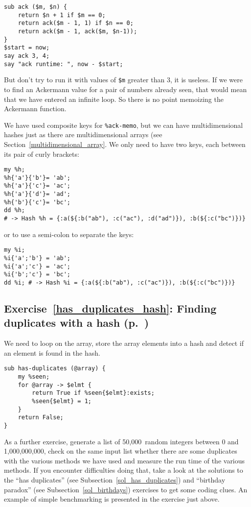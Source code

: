 {\begin{verbatim}
sub ack ($m, $n) {
    return $n + 1 if $m == 0;
    return ack($m - 1, 1) if $n == 0;
    return ack($m - 1, ack($m, $n-1));
}
$start = now;
say ack 3, 4;
say "ack runtime: ", now - $start;
\end{verbatim}

But don't try to run it with values of \verb'$m' greater 
than 3, it is useless. If we were to find an Ackermann 
value for a pair of numbers already seen, that would 
mean that we have entered an infinite loop. So there is 
no point memoizing the Ackermann function.

We have used composite keys for \verb'%ack-memo', but we 
can have multidimensional hashes just as there are 
multidimensional arrays (see Section~\ref{multidimensional_array}. 
We only need to have two keys, each between its pair of 
curly brackets:
\begin{verbatim}
my %h;
%h{'a'}{'b'}= 'ab';
%h{'a'}{'c'}= 'ac';
%h{'a'}{'d'}= 'ad';
%h{'b'}{'c'}= 'bc';
dd %h; 
# -> Hash %h = {:a(${:b("ab"), :c("ac"), :d("ad")}), :b(${:c("bc")})}
\end{verbatim}
%

or to use a semi-colon to separate the keys:

\begin{verbatim}
my %i;
%i{'a';'b'} = 'ab';
%i{'a';'c'} = 'ac';
%i{'b';'c'} = 'bc';
dd %i; # -> Hash %i = {:a(${:b("ab"), :c("ac")}), :b(${:c("bc")})}
\end{verbatim}
%

\subsection{Exercise~\ref{has_duplicates_hash}: Finding duplicates with a hash (p.~\pageref{has_duplicates_hash})}
\label{sol_has_duplicates_hash}

We need to loop on the array, store the array elements into 
a hash and detect if an element is found in the hash.

\begin{verbatim}
sub has-duplicates (@array) {
    my %seen;
    for @array -> $elmt {
        return True if %seen{$elmt}:exists;
        %seen{$elmt} = 1;
    }
    return False;
}
\end{verbatim}

As a further exercise, generate a list of 50,000~random 
integers between 0 and 1,000,000,000, check on the same 
input list whether there are some duplicates with the 
various methods we have used and measure the run time of 
the various methods. If you encounter difficulties doing 
that, take a look at the solutions to the ``has duplicates'' 
(see Subsection~\ref{sol_has_duplicates}) and ``birthday paradox'' (see 
Subsection~\ref{sol_birthdays}) exercises to get some coding clues. An 
example of simple benchmarking is presented in the exercise just 
above.

}

